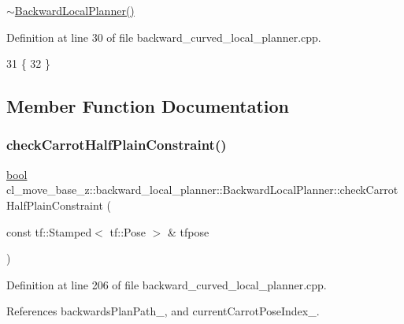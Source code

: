 \hyperlink{classcl__move__base__z_1_1backward__local__planner_1_1BackwardLocalPlanner_a6a36aa94617786c6958e861e64abb862}{$\sim$\+Backward\+Local\+Planner()} 

Definition at line 30 of file backward\+\_\+curved\+\_\+local\+\_\+planner.\+cpp.


\begin{DoxyCode}
31         \{
32         \}
\end{DoxyCode}


\subsection{Member Function Documentation}
\mbox{\label{classcl__move__base__z_1_1backward__local__planner_1_1BackwardLocalPlanner_a22938e354a4ec489101295ed7f2539f6}} 
\subsubsection{\texorpdfstring{check\+Carrot\+Half\+Plain\+Constraint()}{checkCarrotHalfPlainConstraint()}}
{\footnotesize\ttfamily \hyperlink{classbool}{bool} cl\+\_\+move\+\_\+base\+\_\+z\+::backward\+\_\+local\+\_\+planner\+::\+Backward\+Local\+Planner\+::check\+Carrot\+Half\+Plain\+Constraint (\begin{DoxyParamCaption}\item[{const tf\+::\+Stamped$<$ tf\+::\+Pose $>$ \&}]{tfpose }\end{DoxyParamCaption})\hspace{0.3cm}{\ttfamily [private]}}



Definition at line 206 of file backward\+\_\+curved\+\_\+local\+\_\+planner.\+cpp.



References backwards\+Plan\+Path\+\_\+, and current\+Carrot\+Pose\+Index\+\_\+.



